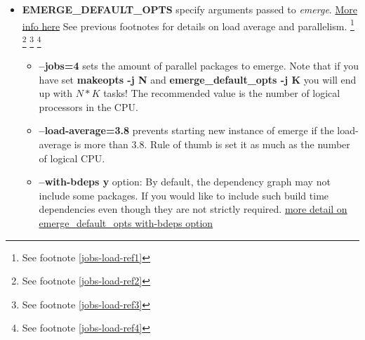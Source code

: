 \documentclass[10pt,a4paper]{article}
\begin{document}
\begin{itemize}
\begin{itemize}[label={o}]
                        \item \textbf{--jobs=4} defines how many parallel sessions to trigger, if they are possible. The recommended value is the number of logical processors in the CPU. You can obtain that number with the following command

    \begin{lstlisting}[style=BashInputUser]
    user$ nproc --all
    \end{lstlisting}

                        \item \textbf{--load-average=3.8} option: This option prevents starting new installations if the load-average is more than $ 3.8 $. It is recommend your load-average to be as much as the number of logical CPU.

                    \end{itemize}

                    \item \textbf{EMERGE\_DEFAULT\_OPTS} specify arguments passed to \textit{emerge}. \href{https://wiki.gentoo.org/wiki/EMERGE_DEFAULT_OPTS}{More info here} See previous footnotes for details on load average and parallelism.
                    \footnote{ See footnote \ref{jobs-load-ref1}}
                    \footnote{ See footnote \ref{jobs-load-ref2}}
                    \footnote{ See footnote \ref{jobs-load-ref3}}
                    \footnote{ See footnote \ref{jobs-load-ref4}}



                    \begin{itemize}[label={o}]
                        \item \textbf{--jobs=4} sets the amount of parallel packages to emerge. Note that if you have set \textbf{makeopts -j N} and \textbf{emerge\_default\_opts -j K} you will end up with $ N*K $ tasks! The recommended value is the number of logical processors in the CPU.

                        \item \textbf{--load-average=3.8} prevents starting new instance of emerge if the load-average is more than $ 3.8 $. Rule of thumb is set it as much as the number of logical CPU.

                        \item \textbf{--with-bdeps y} option: By default, the dependency graph may not include some packages. If you would like to include such build time dependencies even though they are not strictly required. \href{https://wiki.gentoo.org/wiki/Project:Portage/FAQ\#Why_is_it_that_emerge_does_not_update_all_packages.3F}{more detail on emerge\_default\_opts with-bdeps option}


\end{itemize}
\end{itemize}
\end{document}
